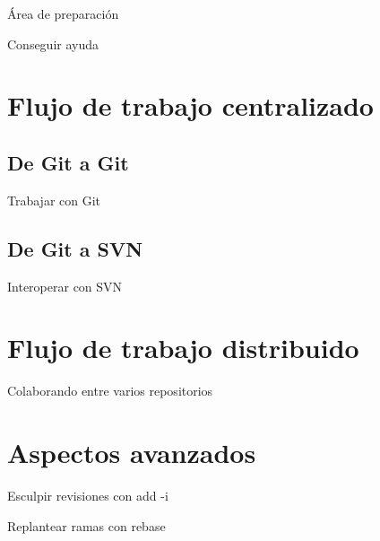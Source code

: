 \documentclass[compress,xcolor=svgnames]{beamer}
\begin{document}
\begin{frame}{Área de preparación}

\end{frame}

\begin{frame}{Conseguir ayuda}

\end{frame}

\section[Centralizado]{Flujo de trabajo centralizado}

\subsection{De Git a Git}

\begin{frame}{Trabajar con Git}

\end{frame}

\subsection{De Git a SVN}

\begin{frame}{Interoperar con SVN}

\end{frame}

\section[Distribuido]{Flujo de trabajo distribuido}

\begin{frame}{Colaborando entre varios repositorios}

\end{frame}

\section[Avanzado]{Aspectos avanzados}

\begin{frame}{Esculpir revisiones con add -i}

\end{frame}

\begin{frame}{Replantear ramas con rebase}

\end{frame}
\end{document}
